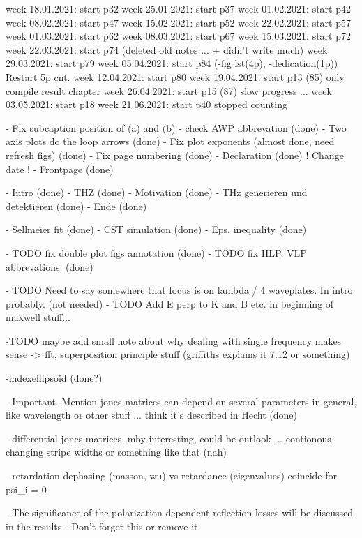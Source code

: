 week 18.01.2021: start p32
week 25.01.2021: start p37
week 01.02.2021: start p42
week 08.02.2021: start p47
week 15.02.2021: start p52
week 22.02.2021: start p57
week 01.03.2021: start p62
week 08.03.2021: start p67
week 15.03.2021: start p72
week 22.03.2021: start p74 (deleted old notes ... + didn't write much)
week 29.03.2021: start p79
week 05.04.2021: start p84 (-fig lst(4p), -dedication(1p)) Restart 5p cnt. 
week 12.04.2021: start p80
week 19.04.2021: start p13 (85) only compile result chapter
week 26.04.2021: start p15 (87) slow progress ...
week 03.05.2021: start p18
week 21.06.2021: start p40
stopped counting

- Fix subcaption position of (a) and (b)
- check AWP abbrevation (done)
- Two axis plots do the loop arrows  (done)
- Fix plot exponents (almost done, need refresh figs) (done)
- Fix page numbering (done)
- Declaration (done) ! Change date !
- Frontpage (done)

- Intro (done)
    - THZ (done)
    - Motivation (done)
- THz generieren und detektieren (done)
- Ende (done)

- Sellmeier fit (done)
- CST simulation (done)
- Eps. inequality (done)

- TODO fix double plot figs annotation (done)
- TODO fix HLP, VLP abbrevations. (done)

- TODO Need to say somewhere that focus is on lambda / 4 waveplates. In intro probably. (not needed)
- TODO Add E perp to K and B etc. in beginning of maxwell stuff...

-TODO maybe add small note about why dealing with single frequency makes sense -> fft, superposition principle stuff (griffiths explains it 7.12 or something)

-indexellipsoid (done?)

- Important. Mention jones matrices can depend on several parameters in general, like wavelength or other stuff ... think it's described in Hecht (done)

- differential jones matrices, mby interesting, could be outlook ... contionous changing stripe widths or something like that (nah)

- retardation dephasing (masson, wu) vs retardance (eigenvalues) coincide for psi_i = 0

- The significance of the polarization dependent reflection losses will be discussed in the results
    - Don't forget this or remove it
    

